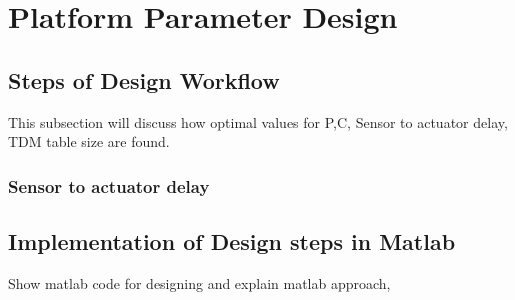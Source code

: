 \section{Platform Parameter Design}
\label{sec:platform}

\subsection{Steps of Design Workflow}

This subsection will discuss how optimal values for P,C, Sensor to actuator delay, TDM table size are found.

\subsubsection{Sensor to actuator delay}
\label{sec:stad}

\subsection{Implementation of Design steps in Matlab}
\color{red}
Show matlab code for designing and explain matlab approach,
\color{black}